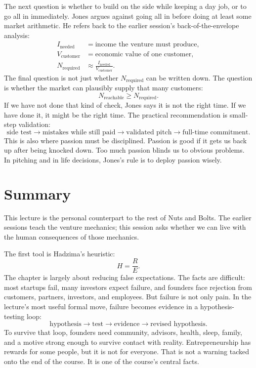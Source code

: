 The next question is whether to build on the side while keeping a day job, or to go all in immediately. Jones argues against going all in before doing at least some market arithmetic. He refers back to the earlier session's back-of-the-envelope analysis:
\begin{align}
I_{\text{needed}}&=\text{income the venture must produce},\\
V_{\text{customer}}&=\text{economic value of one customer},\\
N_{\text{required}}&\approx \frac{I_{\text{needed}}}{V_{\text{customer}}}.
\end{align}
The final question is not just whether \(N_{\text{required}}\) can be written down. The question is whether the market can plausibly supply that many customers:
\begin{equation}
N_{\text{reachable}}\geq N_{\text{required}}.
\end{equation}
If we have not done that kind of check, Jones says it is not the right time. If we have done it, it might be the right time. The practical recommendation is small-step validation:
\begin{equation}
\text{side test}
\longrightarrow
\text{mistakes while still paid}
\longrightarrow
\text{validated pitch}
\longrightarrow
\text{full-time commitment}.
\end{equation}
This is also where passion must be disciplined. Passion is good if it gets us back up after being knocked down. Too much passion blinds us to obvious problems. In pitching and in life decisions, Jones's rule is to deploy passion wisely.

\section{Summary}

This lecture is the personal counterpart to the rest of Nuts and Bolts. The earlier sessions teach the venture mechanics; this session asks whether we can live with the human consequences of those mechanics.

The first tool is Hadzima's heuristic:
\[
H=\frac{R}{E}.
\]
The chapter is largely about reducing false expectations. The facts are difficult: most startups fail, many investors expect failure, and founders face rejection from customers, partners, investors, and employees. But failure is not only pain. In the lecture's most useful formal move, failure becomes evidence in a hypothesis-testing loop:
\[
\text{hypothesis}
\rightarrow
\text{test}
\rightarrow
\text{evidence}
\rightarrow
\text{revised hypothesis}.
\]
To survive that loop, founders need community, advisors, health, sleep, family, and a motive strong enough to survive contact with reality. Entrepreneurship has rewards for some people, but it is not for everyone. That is not a warning tacked onto the end of the course. It is one of the course's central facts.